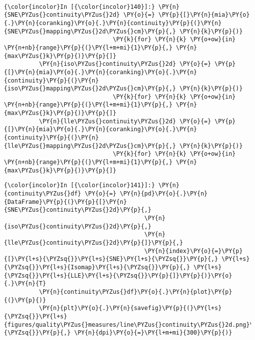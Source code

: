     \begin{center}
    \end{center}
    { \hspace*{\fill} \\}

    \begin{Verbatim}[commandchars=\\\{\}]
{\color{incolor}In [{\color{incolor}140}]:} \PY{n}{SNE\PYZus{}continuity\PYZus{}2d} \PY{o}{=} \PY{p}{[}\PY{n}{mia}\PY{o}{.}\PY{n}{coranking}\PY{o}{.}\PY{n}{continuity}\PY{p}{(}\PY{n}{SNE\PYZus{}mapping\PYZus{}2d\PYZus{}cm}\PY{p}{,} \PY{n}{k}\PY{p}{)}
                               \PY{k}{for} \PY{n}{k} \PY{o+ow}{in} \PY{n+nb}{range}\PY{p}{(}\PY{l+m+mi}{1}\PY{p}{,} \PY{n}{max\PYZus{}k}\PY{p}{)}\PY{p}{]}
          \PY{n}{iso\PYZus{}continuity\PYZus{}2d} \PY{o}{=} \PY{p}{[}\PY{n}{mia}\PY{o}{.}\PY{n}{coranking}\PY{o}{.}\PY{n}{continuity}\PY{p}{(}\PY{n}{iso\PYZus{}mapping\PYZus{}2d\PYZus{}cm}\PY{p}{,} \PY{n}{k}\PY{p}{)}
                               \PY{k}{for} \PY{n}{k} \PY{o+ow}{in} \PY{n+nb}{range}\PY{p}{(}\PY{l+m+mi}{1}\PY{p}{,} \PY{n}{max\PYZus{}k}\PY{p}{)}\PY{p}{]}
          \PY{n}{lle\PYZus{}continuity\PYZus{}2d} \PY{o}{=} \PY{p}{[}\PY{n}{mia}\PY{o}{.}\PY{n}{coranking}\PY{o}{.}\PY{n}{continuity}\PY{p}{(}\PY{n}{lle\PYZus{}mapping\PYZus{}2d\PYZus{}cm}\PY{p}{,} \PY{n}{k}\PY{p}{)}
                               \PY{k}{for} \PY{n}{k} \PY{o+ow}{in} \PY{n+nb}{range}\PY{p}{(}\PY{l+m+mi}{1}\PY{p}{,} \PY{n}{max\PYZus{}k}\PY{p}{)}\PY{p}{]}
\end{Verbatim}

    \begin{Verbatim}[commandchars=\\\{\}]
{\color{incolor}In [{\color{incolor}141}]:} \PY{n}{continuity\PYZus{}df} \PY{o}{=} \PY{n}{pd}\PY{o}{.}\PY{n}{DataFrame}\PY{p}{(}\PY{p}{[}\PY{n}{SNE\PYZus{}continuity\PYZus{}2d}\PY{p}{,}
                                        \PY{n}{iso\PYZus{}continuity\PYZus{}2d}\PY{p}{,}
                                        \PY{n}{lle\PYZus{}continuity\PYZus{}2d}\PY{p}{]}\PY{p}{,}
                                        \PY{n}{index}\PY{o}{=}\PY{p}{[}\PY{l+s}{\PYZsq{}}\PY{l+s}{SNE}\PY{l+s}{\PYZsq{}}\PY{p}{,} \PY{l+s}{\PYZsq{}}\PY{l+s}{Isomap}\PY{l+s}{\PYZsq{}}\PY{p}{,} \PY{l+s}{\PYZsq{}}\PY{l+s}{LLE}\PY{l+s}{\PYZsq{}}\PY{p}{]}\PY{p}{)}\PY{o}{.}\PY{n}{T}
          \PY{n}{continuity\PYZus{}df}\PY{o}{.}\PY{n}{plot}\PY{p}{(}\PY{p}{)}
          \PY{n}{plt}\PY{o}{.}\PY{n}{savefig}\PY{p}{(}\PY{l+s}{\PYZsq{}}\PY{l+s}{figures/quality\PYZus{}measures/line\PYZus{}continuity\PYZus{}2d.png}\PY{l+s}{\PYZsq{}}\PY{p}{,} \PY{n}{dpi}\PY{o}{=}\PY{l+m+mi}{300}\PY{p}{)}
\end{Verbatim}

